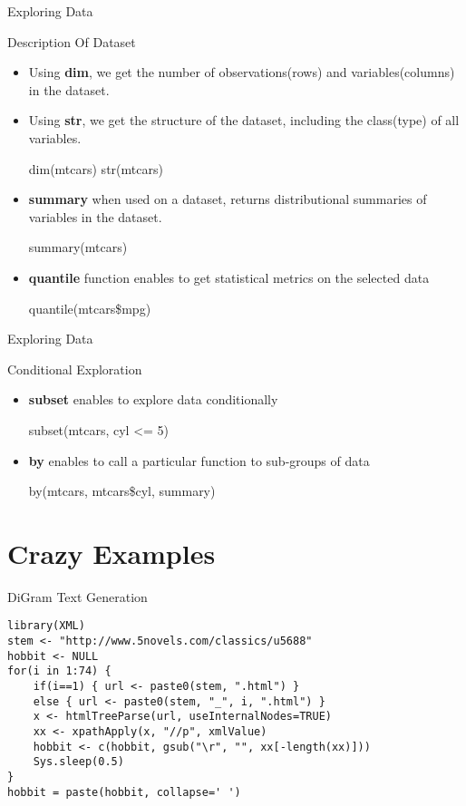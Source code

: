 \begin{frame}{Exploring Data}

\begin{block}{Description Of Dataset}

\begin{itemize}
\item
  Using \textbf{dim}, we get the number of observations(rows) and
  variables(columns) in the dataset.
\item
  Using \textbf{str}, we get the structure of the dataset, including the
  class(type) of all variables.

  dim(mtcars) str(mtcars)
\item
  \textbf{summary} when used on a dataset, returns distributional
  summaries of variables in the dataset.

  summary(mtcars)
\item
  \textbf{quantile} function enables to get statistical metrics on the
  selected data

  quantile(mtcars\$mpg)
\end{itemize}

\end{block}

\end{frame}

\begin{frame}{Exploring Data}

\begin{block}{Conditional Exploration}

\begin{itemize}
\item
  \textbf{subset} enables to explore data conditionally

  subset(mtcars, cyl \textless{}= 5)
\item
  \textbf{by} enables to call a particular function to sub-groups of
  data

  by(mtcars, mtcars\$cyl, summary)
\end{itemize}

\end{block}

\end{frame}

\section{Crazy Examples}\label{crazy-examples}

\begin{frame}[fragile]{DiGram Text Generation}

\begin{verbatim}
library(XML)
stem <- "http://www.5novels.com/classics/u5688"
hobbit <- NULL
for(i in 1:74) {
    if(i==1) { url <- paste0(stem, ".html") } 
    else { url <- paste0(stem, "_", i, ".html") }
    x <- htmlTreeParse(url, useInternalNodes=TRUE)
    xx <- xpathApply(x, "//p", xmlValue)
    hobbit <- c(hobbit, gsub("\r", "", xx[-length(xx)]))
    Sys.sleep(0.5)
}
hobbit = paste(hobbit, collapse=' ')
\end{verbatim}

\end{frame}

